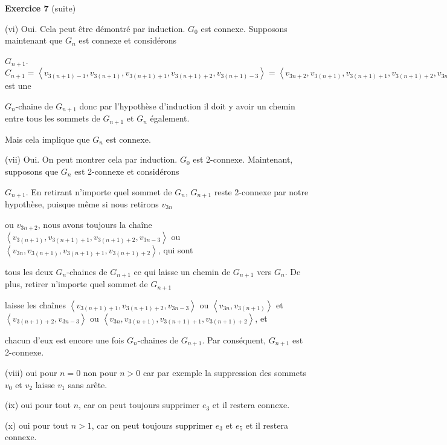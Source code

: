 \documentclass{article}
\newcommand{\tuple}[1]{\ensuremath{\left\langle #1 \right\rangle}}
\begin{document}
\textbf{Exercice 7} (suite)
\vspace{0.3cm}

(vi) Oui. Cela peut être démontré par induction. $G_0$ est connexe. Supposons maintenant que $G_n$ est connexe et considérons 

$G_{n+1}$. $C_{n+1}=\tuple{ v_{3(n + 1) - 1},v_{3(n + 1)},v_{3(n + 1) + 1},v_{3(n + 1) + 2},v_{3(n + 1) - 3}} = \tuple{ v_{3n + 2},v_{3(n+1)},v_{3(n + 1) + 1},v_{3(n + 1) + 2},v_{3n}}$
 est une 
 
 $G_n$-chaine de $G_{n+1}$ donc par l'hypothèse d'induction il doit y avoir un chemin entre tous les sommets de $G_{n+1}$ et $G_n$ également. 
 
 Mais cela implique que $G_n$ est connexe.
\vspace{0.2cm}

(vii) Oui. On peut montrer cela par induction. $ G_0 $ est 2-connexe. Maintenant, supposons que $ G_n $ est 2-connexe et considérons 

$ G_{n+1} $. En retirant n'importe quel sommet de $ G_n $,  $G_{n+1}$ reste 2-connexe par notre hypothèse, puisque même si nous retirons  $v_{3n}$ 

ou $v_{3n+2}$, nous avons toujours la chaîne $\tuple{v_{3(n+1)}, v_{3(n+1)+1}, v_{3(n+1)+2}, v_{3n-3}}$ ou $\tuple{v_{3n}, v_{3(n+1)}, v_{3(n+1)+1}, v_{3(n+1)+2}}$, qui sont 

tous les deux $G_n$-chaines de $G_{n+1}$ ce qui laisse un chemin de $G_{n+1}$ vers $G_n$. De plus, retirer n'importe quel sommet de $G_{n+1}$ 

laisse les chaînes $\tuple{v_{3(n+1)+1}, v_{3(n+1)+2}, v_{3n-3}}$ ou $\tuple{v_{3n}, v_{3(n+1)}}$ et $\tuple{v_{3(n+1)+2}, v_{3n-3}}$ ou $\tuple{v_{3n}, v_{3(n+1)}, v_{3(n+1)+1}, v_{3(n+1)+2}}$, et 

chacun d'eux est encore une fois $G_n$-chaines de $G_{n+1}$. Par conséquent, $G_{n+1}$ est 2-connexe.
\vspace{0.2cm}

(viii) oui pour $n = 0$ non pour $n > 0$ car par exemple la suppression des sommets $v_0$ et $v_2$ laisse $v_1$ sans arête.
\vspace{0.2cm}

(ix) oui pour tout $n$, car on peut toujours supprimer $e_3$ et il restera connexe.
\vspace{0.2cm}

(x) oui pour tout $n > 1$, car on peut toujours supprimer $e_3$ et $e_5$ et il restera connexe.
\vspace{0.2cm}
\end{document}
